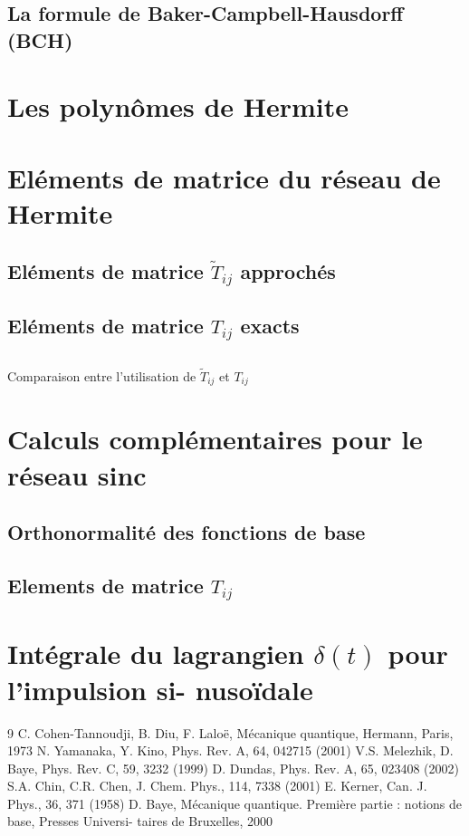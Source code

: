 \documentclass[a4paper, 12pt]{report}
\begin{document}
\section{La formule de Baker-Campbell-Hausdorff (BCH)}
\chapter{Les polynômes de Hermite}
\chapter{Eléments de matrice du réseau de Hermite}
\section{Eléments de matrice $\tilde{T}_{ij}$ approchés}
\section{Eléments de matrice $T_{ij} $ exacts}
\section{}Comparaison entre l’utilisation de $\tilde{T}_{ij}$ et $T_{ij} $
\chapter{Calculs complémentaires pour le réseau sinc}
\section{Orthonormalité des fonctions de base}
\section{Elements de matrice $T_{ij}$}
\chapter{Intégrale du lagrangien $\delta(t) $ pour l’impulsion si-
nusoïdale}

\begin{thebibliography}{9}
\bibitem{[1]} C. Cohen-Tannoudji, B. Diu, F. Laloë, Mécanique quantique, Hermann, Paris, 1973
\bibitem{[2]} N. Yamanaka, Y. Kino, Phys. Rev. A, 64, 042715 (2001)
\bibitem{[3]} V.S. Melezhik, D. Baye, Phys. Rev. C, 59, 3232 (1999)
\bibitem{[4]} D. Dundas, Phys. Rev. A, 65, 023408 (2002)
\bibitem{[5]} S.A. Chin, C.R. Chen, J. Chem. Phys., 114, 7338 (2001)
\bibitem{[6]} E. Kerner, Can. J. Phys., 36, 371 (1958)
\bibitem{[11]} D. Baye, Mécanique quantique. Première partie : notions de base, Presses Universi-
taires de Bruxelles, 2000
\end{thebibliography}
\end{document}
